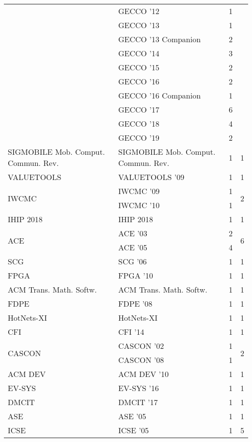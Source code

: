 \begin{table*}[t]
\begin{tabular}{llrr}
& GECCO '12 & 1 &\\
& GECCO '13 & 1 &\\
& GECCO '13 Companion & 2 &\\
& GECCO '14 & 3 &\\
& GECCO '15 & 2 &\\
& GECCO '16 & 2 &\\
& GECCO '16 Companion & 1 &\\
& GECCO '17 & 6 &\\
& GECCO '18 & 4 &\\
& GECCO '19 & 2 &\\
\multirow{1}{*}{SIGMOBILE Mob. Comput. Commun. Rev.} & SIGMOBILE Mob. Comput. Commun. Rev. & 1 & \multirow{1}{*}{1}\\
\multirow{1}{*}{VALUETOOLS } & VALUETOOLS '09 & 1 & \multirow{1}{*}{1}\\
\multirow{2}{*}{IWCMC } & IWCMC '09 & 1 & \multirow{2}{*}{2}\\
& IWCMC '10 & 1 &\\
\multirow{1}{*}{IHIP 2018} & IHIP 2018 & 1 & \multirow{1}{*}{1}\\
\multirow{2}{*}{ACE } & ACE '03 & 2 & \multirow{2}{*}{6}\\
& ACE '05 & 4 &\\
\multirow{1}{*}{SCG } & SCG '06 & 1 & \multirow{1}{*}{1}\\
\multirow{1}{*}{FPGA } & FPGA '10 & 1 & \multirow{1}{*}{1}\\
\multirow{1}{*}{ACM Trans. Math. Softw.} & ACM Trans. Math. Softw. & 1 & \multirow{1}{*}{1}\\
\multirow{1}{*}{FDPE } & FDPE '08 & 1 & \multirow{1}{*}{1}\\
\multirow{1}{*}{HotNets-XI} & HotNets-XI & 1 & \multirow{1}{*}{1}\\
\multirow{1}{*}{CFI } & CFI '14 & 1 & \multirow{1}{*}{1}\\
\multirow{2}{*}{CASCON } & CASCON '02 & 1 & \multirow{2}{*}{2}\\
& CASCON '08 & 1 &\\
\multirow{1}{*}{ACM DEV } & ACM DEV '10 & 1 & \multirow{1}{*}{1}\\
\multirow{1}{*}{EV-SYS } & EV-SYS '16 & 1 & \multirow{1}{*}{1}\\
\multirow{1}{*}{DMCIT } & DMCIT '17 & 1 & \multirow{1}{*}{1}\\
\multirow{1}{*}{ASE } & ASE '05 & 1 & \multirow{1}{*}{1}\\
\multirow{4}{*}{ICSE } & ICSE '05 & 1 & \multirow{4}{*}{5}\\

\end{tabular}
\end{table*}
